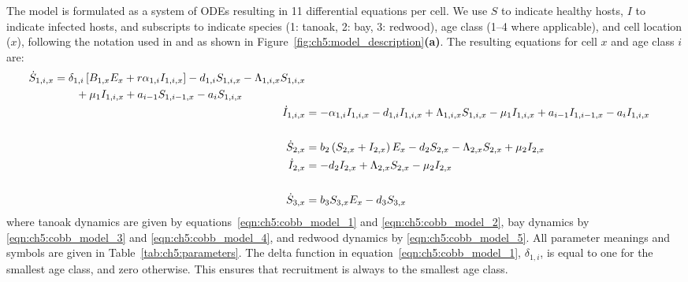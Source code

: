 The model is formulated as a system of ODEs resulting in 11 differential equations per cell. We use $S$ to indicate healthy hosts, $I$ to indicate infected hosts, and subscripts to indicate species (1: tanoak, 2: bay, 3: redwood), age class (1--4 where applicable), and cell location ($x$), following the notation used in \citet{cobb_ecosystem_2012} and as shown in Figure~\ref{fig:ch5:model_description}\textbf{(a)}. The resulting equations for cell $x$ and age class $i$ are:
\begin{subequations}\label{eqn:ch5:cobb_model}
\begin{align}
    \begin{split}
        \dot{S}_{1,i,x} &= \delta_{1,i}\left[B_{1,x}E_x+r\alpha_{1,i}I_{1,i,x}\right] - d_{1,i}S_{1,i,x} - \Lambda_{1,i,x}S_{1,i,x} \\
        &{}\quad\quad+ \mu_1I_{1,i,x} + a_{i-1}S_{1,i-1,x} - a_iS_{1,i,x} \label{eqn:ch5:cobb_model_1}
    \end{split}\\
    \dot{I}_{1,i,x} &= -\alpha_{1,i}I_{1,i,x} - d_{1,i}I_{1,i,x} + \Lambda_{1,i,x}S_{1,i,x} - \mu_1I_{1,i,x} + a_{i-1}I_{1,i-1,x} - a_iI_{1,i,x} \label{eqn:ch5:cobb_model_2} \\\notag\\
    \dot{S}_{2,x} &= b_2\left(S_{2,x}+I_{2,x}\right)E_x - d_2S_{2,x} - \Lambda_{2,x}S_{2,x} + \mu_2I_{2,x} \label{eqn:ch5:cobb_model_3} \\
    \dot{I}_{2,x} &= - d_2I_{2,x} + \Lambda_{2,x}S_{2,x} - \mu_2I_{2,x}\label{eqn:ch5:cobb_model_4} \\\notag\\
    \dot{S}_{3,x} &= b_3S_{3,x}E_x - d_3S_{3,x} \label{eqn:ch5:cobb_model_5}
\end{align}
\end{subequations}
where tanoak dynamics are given by equations~\ref{eqn:ch5:cobb_model_1} and \ref{eqn:ch5:cobb_model_2}, bay dynamics by \ref{eqn:ch5:cobb_model_3} and \ref{eqn:ch5:cobb_model_4}, and redwood dynamics by \ref{eqn:ch5:cobb_model_5}. All parameter meanings and symbols are given in Table~\ref{tab:ch5:parameters}. The delta function in equation~\ref{eqn:ch5:cobb_model_1}, $\delta_{1,i}$, is equal to one for the smallest age class, and zero otherwise. This ensures that recruitment is always to the smallest age class.

